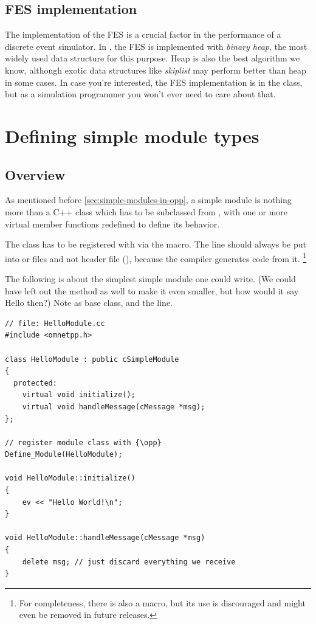 \subsection{FES implementation}

The implementation of the FES is a crucial factor in the
performance of a discrete event simulator. In {\opp}, the FES is
implemented with \textit{binary heap}, the most
widely used data structure for this purpose. Heap is also the best
algorithm we know, although exotic data structures like
\textit{skiplist} may perform better than heap in some
cases. In case you're interested, the FES implementation is in the
 class, but as a simulation programmer you won't
ever need to care about that.





\section{Defining simple module types}

\subsection{Overview}

As mentioned before \ref{sec:simple-modules-in-opp}, a simple module
is nothing more than a C++ class which has to be subclassed from
, with one or more virtual member functions redefined
to define its behavior.

The class has to be registered with {\opp} via the  macro.
The  line should always be put into  or 
files and not header file (), because the compiler generates code from it.
      \footnote{For completeness, there is also a 
                macro, but its use is discouraged and might even be removed in
                future {\opp} releases.}

The following  is about the simplest simple module one could write.
(We could have left out the  method as well to make it even smaller,
but how would it say Hello then?) Note  as base class,
and the  line.

\begin{verbatim}
// file: HelloModule.cc
#include <omnetpp.h>

class HelloModule : public cSimpleModule
{
  protected:
    virtual void initialize();
    virtual void handleMessage(cMessage *msg);
};

// register module class with {\opp}
Define_Module(HelloModule);

void HelloModule::initialize()
{
    ev << "Hello World!\n";
}

void HelloModule::handleMessage(cMessage *msg)
{
    delete msg; // just discard everything we receive
}
\end{verbatim}

